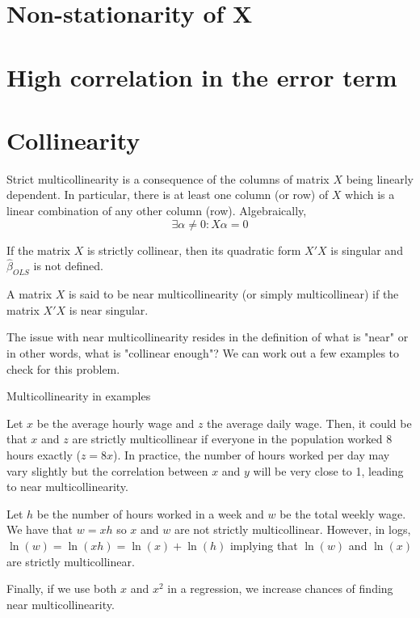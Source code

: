 \section{Non-stationarity of X}

\section{High correlation in the error term}

\section{Collinearity}

\begin{definition}
Strict multicollinearity is a consequence of the columns of matrix $X$ being linearly dependent. In particular, there is at least one column (or row) of $X$ which is a linear combination of any other column (row). Algebraically, $$\exists \alpha\neq 0 : X\alpha = 0$$
\end{definition}

\begin{proposition}
If the matrix $X$ is strictly collinear, then its quadratic form $X'X$ is singular and $\hat{\beta}_{OLS}$ is not defined.
\end{proposition}

\begin{definition}
A matrix $X$ is said to be near multicollinearity (or simply multicollinear) if the matrix $X'X$ is near singular.
\end{definition}

The issue with near multicollinearity resides in the definition of what is "near" or in other words, what is "collinear enough"? We can work out a few examples to check for this problem.

\begin{bclogo}[couleur=blue!10, arrondi=0.1, logo=,ombre=false]{ Multicollinearity in examples} 
\begin{small}
Let $x$ be the average hourly wage and $z$ the average daily wage. Then, it could be that $x$ and $z$ are strictly multicollinear if everyone in the population worked 8 hours exactly ($z = 8x$). In practice, the number of hours worked per day may vary slightly but the correlation between $x$ and $y$ will be very close to 1, leading to near multicollinearity.

Let $h$ be the number of hours worked in a week and $w$ be the total weekly wage. We have that $w = xh$ so $x$ and $w$ are not strictly multicollinear. However, in logs, $\ln(w) = \ln(xh) = \ln(x) + \ln(h)$ implying that $\ln(w)$ and $\ln(x)$ are strictly multicollinear.

Finally, if we use both $x$ and $x^2$ in a regression, we increase chances of finding near multicollinearity.
\end{small}
\end{bclogo}


